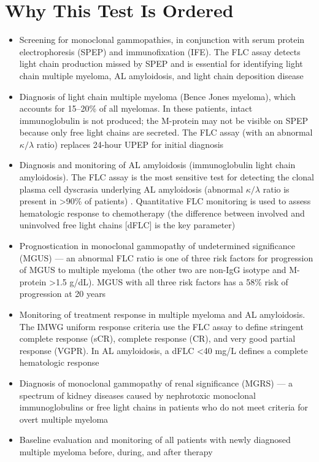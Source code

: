 \section*{Why This Test Is Ordered}
\begin{itemize}
  \item Screening for monoclonal gammopathies, in conjunction with serum protein electrophoresis (SPEP) and immunofixation (IFE). The FLC assay detects light chain production missed by SPEP and is essential for identifying light chain multiple myeloma, AL amyloidosis, and light chain deposition disease
  \item Diagnosis of light chain multiple myeloma (Bence Jones myeloma), which accounts for 15--20\% of all myelomas. In these patients, intact immunoglobulin is not produced; the M-protein may not be visible on SPEP because only free light chains are secreted. The FLC assay (with an abnormal $\kappa/\lambda$ ratio) replaces 24-hour UPEP for initial diagnosis
  \item Diagnosis and monitoring of AL amyloidosis (immunoglobulin light chain amyloidosis). The FLC assay is the most sensitive test for detecting the clonal plasma cell dyscrasia underlying AL amyloidosis (abnormal $\kappa/\lambda$ ratio is present in >90\% of patients) \cite{palladini2018serum}. Quantitative FLC monitoring is used to assess hematologic response to chemotherapy (the difference between involved and uninvolved free light chains [dFLC] is the key parameter)
  \item Prognostication in monoclonal gammopathy of undetermined significance (MGUS) --- an abnormal FLC ratio is one of three risk factors for progression of MGUS to multiple myeloma (the other two are non-IgG isotype and M-protein >1.5 g/dL). MGUS with all three risk factors has a 58\% risk of progression at 20 years
  \item Monitoring of treatment response in multiple myeloma and AL amyloidosis. The IMWG uniform response criteria use the FLC assay to define stringent complete response (sCR), complete response (CR), and very good partial response (VGPR). In AL amyloidosis, a dFLC <40 mg/L defines a complete hematologic response
  \item Diagnosis of monoclonal gammopathy of renal significance (MGRS) --- a spectrum of kidney diseases caused by nephrotoxic monoclonal immunoglobulins or free light chains in patients who do not meet criteria for overt multiple myeloma
  \item Baseline evaluation and monitoring of all patients with newly diagnosed multiple myeloma before, during, and after therapy
\end{itemize}

